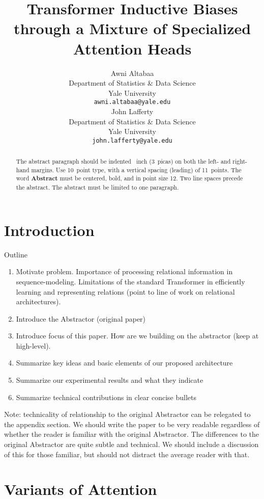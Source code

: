 \documentclass{article}
\title{Transformer Inductive Biases through a Mixture of Specialized Attention Heads}
\author{%
  Awni Altabaa\\ %
  Department of Statistics \& Data Science\\
  Yale University\\
  \texttt{awni.altabaa@yale.edu} \\
  \And
  John Lafferty \\
  Department of Statistics \& Data Science \\
  Yale University \\
  \texttt{john.lafferty@yale.edu}
}
\begin{document}
\maketitle


\begin{abstract}
  The abstract paragraph should be indented ~inch (3~picas) on
  both the left- and right-hand margins. Use 10~point type, with a vertical
  spacing (leading) of 11~points.  The word \textbf{Abstract} must be centered,
  bold, and in point size 12. Two line spaces precede the abstract. The abstract
  must be limited to one paragraph.
\end{abstract}

\tableofcontents

\newpage

\section{Introduction}

Outline
\begin{enumerate}
  \item Motivate problem. Importance of processing relational information in sequence-modeling. Limitations of the standard Transformer in efficiently learning and representing relations (point to line of work on relational architectures).
  \item Introduce the Abstractor (original paper)
  \item Introduce focus of this paper. How are we building on the abstractor (keep at high-level).
  \item Summarize key ideas and basic elements of our proposed architecture
  \item Summarize our experimental results and what they indicate
  \item Summarize technical contributions in clear concise bullets
\end{enumerate}

Note: technicality of relationship to the original Abstractor can be relegated to the appendix section. We should write the paper to be very readable regardless of whether the reader is familiar with the original Abstractor. The differences to the original Abstractor are quite subtle and technical. We should include a discussion of this for those familiar, but should not distract the average reader with that.

\section{Variants of Attention}
\end{document}
